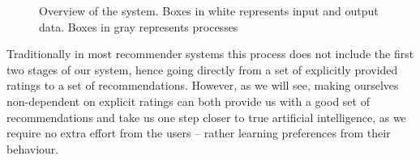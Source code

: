 \begin{figure}[H]
  \caption{Overview of the system. Boxes in white represents input and output
  data. Boxes in gray represents processes}
\end{figure}

Traditionally in most recommender systems this process does not include the
first two stages of our system, hence going directly from a set of explicitly
provided ratings to a set of recommendations. However, as we will see, making
ourselves non-dependent on explicit ratings can both provide us with a good
set of recommendations and take us one step closer to true artificial
intelligence, as we require no extra effort from the users – rather learning
preferences from their behaviour.

